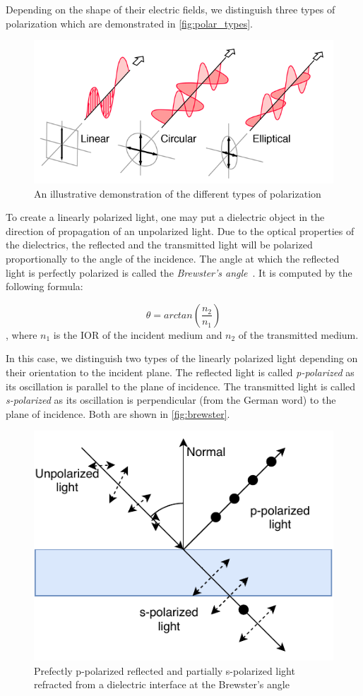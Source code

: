 Depending on the shape of their electric fields, we distinguish three types of polarization which are demonstrated in \autoref{fig:polar_types}.

\begin{figure}[h]
	\centering
	\includegraphics[width=.7\linewidth]{img/polar_types.png}
	\caption[polar types]{An illustrative demonstration of the different types of polarization \footnotemark}
	\label{fig:polar_types}
\end{figure}

To create a linearly polarized light, one may put a dielectric object in the direction of propagation of an unpolarized light. Due to the optical properties of the dielectrics, the reflected and the transmitted light will be polarized proportionally to the angle of the incidence. The angle at which the reflected light is perfectly polarized is called the \emph{Brewster's angle}~\cite{brewster1815laws}. It is computed by the following formula:

\begin{equation}
\theta=arctan(\frac{n_2}{n_1})
\end{equation}
, where $n_1$ is the IOR of the incident medium and $n_2$ of the transmitted medium.

In this case, we distinguish two types of the linearly polarized light depending on their orientation to the incident plane. The reflected light is called \emph{p-polarized} as its oscillation is parallel to the plane of incidence. The transmitted light is called \emph{s-polarized} as its oscillation is perpendicular (from the German word) to the plane of incidence. Both are shown in \autoref{fig:brewster}.

\begin{figure}[h]
	\centering
	\includegraphics[width=.7\linewidth]{img/brewster.pdf}
	\caption{Prefectly p-polarized reflected and partially s-polarized light refracted from a dielectric interface at the Brewster's angle}
	\label{fig:brewster}
\end{figure}


